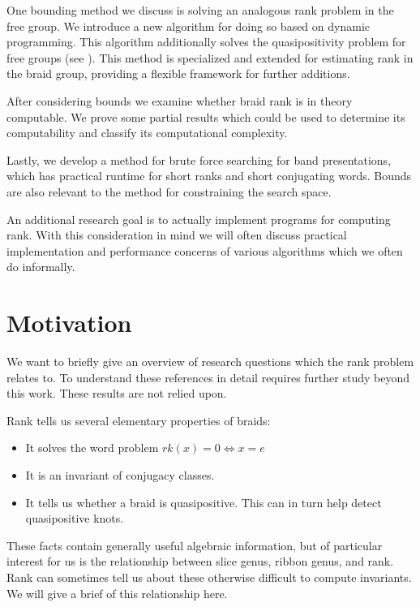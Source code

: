 \documentclass[12pt]{thesis}
\begin{document}
One bounding method we discuss is solving an analogous rank problem in the free group.
We introduce a new algorithm for doing so based on dynamic programming.
This algorithm additionally solves the quasipositivity problem for free groups (see \cite{quasipositive-3-braids}).
This method is specialized and extended for estimating rank in the braid group, providing a flexible framework
for further additions.

After considering bounds we examine whether braid rank is in theory computable.
We prove some partial results which could be used to determine its computability
and classify its computational complexity.

Lastly, we develop a method for brute force searching for band presentations,
which has practical runtime for short ranks and short conjugating words.
Bounds are also relevant to the method for constraining the search space.

An additional research goal is to actually implement programs for computing rank.
With this consideration in mind 
we will often discuss practical implementation 
and performance concerns of various algorithms
which we often do informally.

\section{Motivation}

\label{sec:motivation}

We want to briefly give an overview of research
questions which the rank problem relates to.
To understand these references in detail requires further study
beyond this work. These results are not relied upon.

Rank tells us several elementary properties of braids:
\begin{itemize}
    \item It solves the word problem $rk(x) = 0 \Leftrightarrow x = e$
    \item It is an invariant of conjugacy classes.
    \item It tells us whether a braid is quasipositive.
          This can in turn help detect quasipositive knots.
\end{itemize}

These facts contain generally useful algebraic information, but of particular
interest for us is the relationship between slice genus, ribbon genus, and rank.
Rank can sometimes tell us about these otherwise difficult to compute invariants.
We will give a brief of this relationship here.
\end{document}
